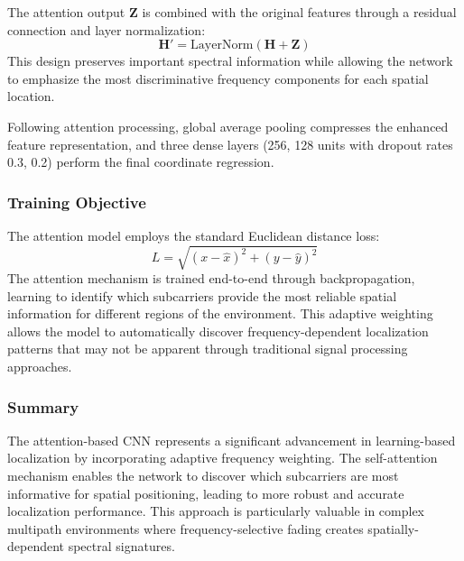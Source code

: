 The attention output $\mathbf{Z}$ is combined with the original features through a residual connection and layer normalization:
\[
\mathbf{H}' = \text{LayerNorm}(\mathbf{H} + \mathbf{Z})
\]
This design preserves important spectral information while allowing the network to emphasize the most discriminative frequency components for each spatial location.

Following attention processing, global average pooling compresses the enhanced feature representation, and three dense layers (256, 128 units with dropout rates 0.3, 0.2) perform the final coordinate regression.

\subsubsection{Training Objective}
The attention model employs the standard Euclidean distance loss:
\[
L = \sqrt{(x - \hat{x})^2 + (y - \hat{y})^2}
\]
The attention mechanism is trained end-to-end through backpropagation, learning to identify which subcarriers provide the most reliable spatial information for different regions of the environment. This adaptive weighting allows the model to automatically discover frequency-dependent localization patterns that may not be apparent through traditional signal processing approaches.

\subsubsection{Summary}
The attention-based CNN represents a significant advancement in learning-based localization by incorporating adaptive frequency weighting. The self-attention mechanism enables the network to discover which subcarriers are most informative for spatial positioning, leading to more robust and accurate localization performance. This approach is particularly valuable in complex multipath environments where frequency-selective fading creates spatially-dependent spectral signatures.

